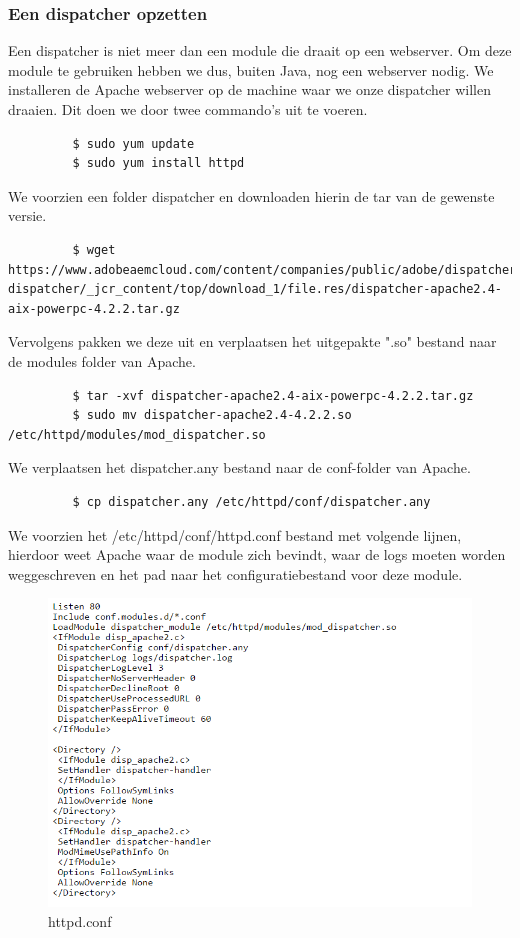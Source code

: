 \documentclass{article}
\begin{document}
	\subsubsection{Een dispatcher opzetten}
	Een dispatcher is niet meer dan een module die draait op een webserver. Om deze module te gebruiken hebben we dus, buiten Java, nog een webserver nodig. We installeren de Apache webserver op de machine waar we onze dispatcher willen draaien. Dit doen we door twee commando's uit te voeren.
	\begin{lstlisting}
		 $ sudo yum update
		 $ sudo yum install httpd
	\end{lstlisting}
	We voorzien een folder dispatcher en downloaden hierin de tar van de gewenste versie.
	\begin{lstlisting}
		 $ wget https://www.adobeaemcloud.com/content/companies/public/adobe/dispatcher/		 dispatcher/_jcr_content/top/download_1/file.res/dispatcher-apache2.4-aix-powerpc-4.2.2.tar.gz
	\end{lstlisting}
	Vervolgens pakken we deze uit en verplaatsen het uitgepakte ".so" bestand naar de modules folder van Apache.
	\begin{lstlisting}
		 $ tar -xvf dispatcher-apache2.4-aix-powerpc-4.2.2.tar.gz
		 $ sudo mv dispatcher-apache2.4-4.2.2.so /etc/httpd/modules/mod_dispatcher.so
	\end{lstlisting}
	We verplaatsen het dispatcher.any bestand naar de conf-folder van Apache.
	\begin{lstlisting}
		 $ cp dispatcher.any /etc/httpd/conf/dispatcher.any
	\end{lstlisting}
	We voorzien het /etc/httpd/conf/httpd.conf bestand met volgende lijnen, hierdoor weet Apache waar de module zich bevindt, waar de logs moeten worden weggeschreven en het pad naar het configuratiebestand voor deze module.
	\begin{figure}[h!]
  		\includegraphics[width=\linewidth]{images/httpd-conf.PNG}
  		\caption{httpd.conf}
  		\label{fig:httpd.conf}
	\end{figure}
\end{document}

